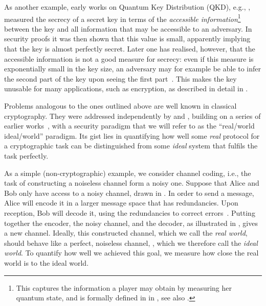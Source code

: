 As another example, early works on Quantum Key Distribution (QKD),
e.g., \textcite{May96,BBBMR00,SP00}, measured the secrecy of a secret
key in terms of the \emph{accessible information}\footnote{This
  captures the information a player may obtain by measuring her
  quantum state, and is formally defined in  in
  , see also \textcite{nielsen2010quantum}.}
between the key and all information that may be accessible to an
adversary. In security proofs it was then shown that this value is
small, apparently implying that the key is almost perfectly
secret. Later one has realised, however, that the accessible
information is not a good measure for secrecy: even if this measure is
exponentially small in the key size, an adversary may for example be
able to infer the second part of the key upon seeing the first
part~\cite{KRBM07}. This makes the key unusable for many applications,
such as encryption, as described in detail in
.

Problems analogous to the ones outlined above are well known in classical cryptography. They were addressed independently by
\textcite{PW00,PW01} and \textcite{Can01}, building on a series of
earlier works~\cite{GMW86,Bea92,MR92,Can00}, with a security paradigm
that we will refer to as the ``real\-/world ideal\-/world'' paradigm.
Its gist lies in quantifying how well some \emph{real} protocol for a
cryptographic task can be distinguished from some \emph{ideal} system
that fulfils the task perfectly.

As a simple (non-cryptographic) example, we consider channel coding, i.e., the task of constructing a noiseless channel form a noisy one. Suppose that Alice
and Bob only have access to a noisy channel, drawn in
. In order to send a 
message, Alice will encode it in a larger message space that has
redundancies. Upon reception, Bob will decode it, using the redundancies to correct errors~\cite{nielsen2010quantum}. Putting together the encoder, the noisy channel, and the 
decoder, as illustrated in
, gives a new channel. Ideally, this constructed channel, which we call the \emph{real world}, should behave like a perfect, noiseless channel,
, which we therefore call the \emph{ideal world}. To quantify how well we achieved this goal, we measure how close the real world is to the ideal world.

